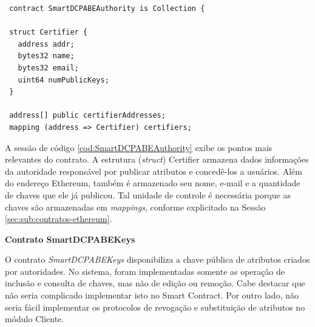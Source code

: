 \documentclass[a4paper,11pt]{article}
\begin{document}

\begin{lstlisting}
 contract SmartDCPABEAuthority is Collection {

 struct Certifier {
   address addr;
   bytes32 name;
   bytes32 email;
   uint64 numPublicKeys;
 }

 address[] public certifierAddresses;
 mapping (address => Certifier) certifiers;
\end{lstlisting} %


A sessão de código \ref{cod:SmartDCPABEAuthority} exibe os pontos mais relevantes do contrato.
A estrutura (\textit{struct}) Certifier armazena dados informações da autoridade responsável por publicar atributos e concedê-los a usuários.
Além do endereço Ethereum, também é armazenado seu nome, e-mail e a quantidade de chaves que ele já publicou.
Tal unidade de controle é necessária porque as chaves são armazenadas em \emph{mappings}, conforme explicitado na Sessão \ref{sec:sub:contratos-ethereum}.

\textbf{Contrato SmartDCPABEKeys}



O contrato \emph{SmartDCPABEKeys} disponibiliza a chave pública de atributos criados por autoridades.
No sistema, foram implementadas somente as operação de inclusão e consulta de chaves, mas não de edição ou remoção.
Cabe destacar que não seria complicado implementar isto no Smart Contract.
Por outro lado, não seria fácil implementar os protocolos de revogação e substituição de atributos no módulo Cliente.%
\end{document}
